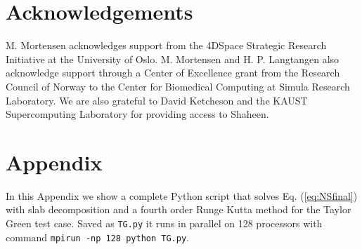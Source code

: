 \documentclass[final,3p,times,twocolumn]{elsarticle}
\newcommand{\inpyth}{\lstinline[style=inlinestyle]} %[]%
\begin{document}
\section*{Acknowledgements}
M. Mortensen acknowledges support from the 4DSpace Strategic Research 
Initiative at the University of Oslo. M. Mortensen and H. P. Langtangen also 
acknowledge support through a Center of Excellence grant from the Research 
Council of Norway to the Center for Biomedical Computing at Simula Research 
Laboratory. We are also grateful to David Ketcheson and the 
KAUST Supercomputing Laboratory for providing access to Shaheen.



\section*{Appendix}
\label{sec:appendix}
In this Appendix we show a complete Python script that solves Eq. 
(\ref{eq:NSfinal}) with slab decomposition and a fourth order Runge Kutta 
method for the Taylor Green test case. Saved as \inpyth{TG.py} it runs in 
parallel on 128 processors with command \inpyth{mpirun -np 128 python TG.py}.
\end{document}
